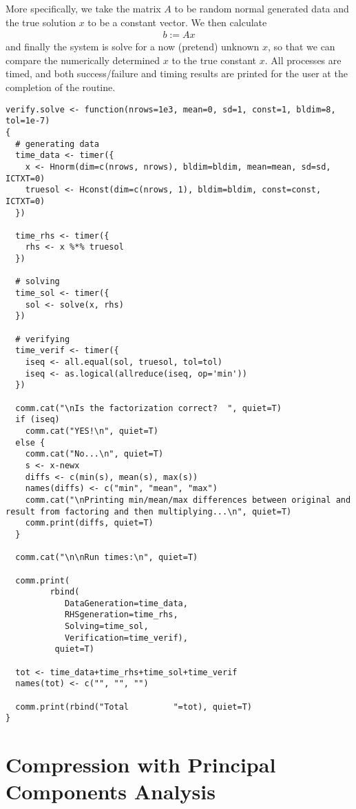 More specifically, we take the matrix $A$ to be random normal generated data and the true solution $x$ to be a constant vector.  We then calculate
\begin{align*}
b := Ax
\end{align*}
and finally the system is solve for a now (pretend) unknown $x$, so that we can compare the numerically determined $x$ to the true constant $x$.  All processes are timed, and both success/failure and timing results are printed for the user at the completion of the routine. 

\begin{lstlisting}[language=rr,title=Verifying Distributed System Solving]
verify.solve <- function(nrows=1e3, mean=0, sd=1, const=1, bldim=8, tol=1e-7)
{
  # generating data
  time_data <- timer({
    x <- Hnorm(dim=c(nrows, nrows), bldim=bldim, mean=mean, sd=sd, ICTXT=0)
    truesol <- Hconst(dim=c(nrows, 1), bldim=bldim, const=const, ICTXT=0)
  })
  
  time_rhs <- timer({
    rhs <- x %*% truesol
  })

  # solving
  time_sol <- timer({
    sol <- solve(x, rhs)
  })
  
  # verifying
  time_verif <- timer({
    iseq <- all.equal(sol, truesol, tol=tol)
    iseq <- as.logical(allreduce(iseq, op='min'))
  })
  
  comm.cat("\nIs the factorization correct?  ", quiet=T)
  if (iseq)
    comm.cat("YES!\n", quiet=T)
  else {
    comm.cat("No...\n", quiet=T)
    s <- x-newx
    diffs <- c(min(s), mean(s), max(s))
    names(diffs) <- c("min", "mean", "max")
    comm.cat("\nPrinting min/mean/max differences between original and result from factoring and then multiplying...\n", quiet=T)
    comm.print(diffs, quiet=T)
  }
  
  comm.cat("\n\nRun times:\n", quiet=T)
  
  comm.print( 
         rbind(
            DataGeneration=time_data, 
            RHSgeneration=time_rhs,
            Solving=time_sol, 
            Verification=time_verif),
          quiet=T)
  
  tot <- time_data+time_rhs+time_sol+time_verif
  names(tot) <- c("", "", "")
  
  comm.print(rbind("Total         "=tot), quiet=T)
}
\end{lstlisting}








\section{Compression with Principal Components Analysis}

